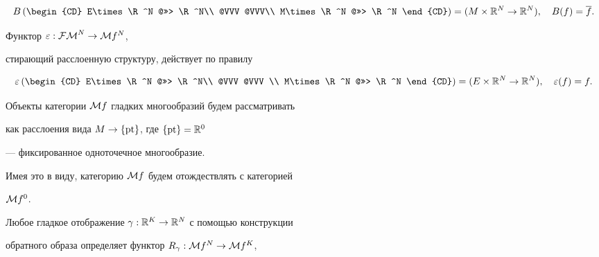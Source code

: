 $$


B\left(


\begin{CD}


E\times\R^N @>>> \R^N\\


@VVV @VVV\\


M\times\R^N @>>> \R^N


\end{CD}


\right)=(M\times\R^N\to\R^N),\quad B(f)=\overline{f}.


$$


Функтор $\varepsilon:{\cal{FM}}^N\rightarrow{\cal M} f^N$,


стирающий расслоенную структуру, действует по правилу


$$


\eps\left(


\begin{CD}


E\times\R^N @>>> \R^N\\


@VVV @VVV \\


M\times\R^N @>>> \R^N


\end{CD}


\right)=(E\times\R^N\to\R^N),\quad \eps(f)=f.


$$





\begin{notenonum}


Объекты категории ${\cal M} f$ гладких многообразий будем рассматривать


как расслоения вида $M\rightarrow\{\operatorname{pt}\}$, где $\{\operatorname{pt}\}={\Bbb R}^0$


--- фиксированное одноточечное многообразие.


Имея это в виду, категорию ${\cal M} f$ будем отождествлять с категорией


${\cal M} f^0$.


\end{notenonum}








Любое гладкое отображение $\gamma:{\Bbb R}^K\rightarrow{\Bbb R}^N$ с помощью конструкции


обратного образа определяет функтор $R_{\gamma}:{\cal M} f^N\rightarrow{\cal M} f^K$,


